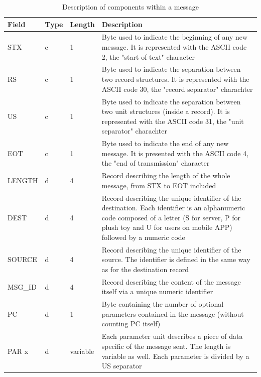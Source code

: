 \begin{table}[H]
\centering
\caption{Description of components within a message}
\label{my-label}
\begin{tabular}{|l|l|l|p{10cm}|}
\hline
\textbf{Field} & \textbf{Type} & \textbf{Length} & \textbf{Description}  \\ \hline
STX            & c             & 1               & Byte used to indicate the beginning of any new message. It is represented with the ASCII code 2, the "start of text" character \newline \\
RS             & c             & 1               & Byte used to indicate the separation between two record structures. It is represented with the ASCII code 30, the "record separator" charachter \newline \\
US             & c             & 1               & Byte used to indicate the separation between two unit structures (inside a record). It is represented with the ASCII code 31, the "unit separator" charachter \newline \\
EOT            & c             & 1               & Byte used to indicate the end of any new message. It is presented with the ASCII code 4, the "end of transmission" character \newline \\
LENGTH         & d             & 4               & Record describing the length of the whole message, from STX to EOT included \newline \\
DEST           & d             & 4               & Record describing the unique identifier of the destination. Each identifier is an alphanumeric code composed of a letter (S for server, P for plush toy and U for users on mobile APP) followed by a numeric code \newline \\
SOURCE         & d             & 4               & Record describing the unique identifier of the source. The identifier is defined in the same way as for the destination record \newline \\
MSG\_ID        & d             & 4               & Record describing the content of the message itself via a unique numeric identifier \newline \\ 
PC             & d             & 1               & Byte containing the number of optional parameters contained in the message (without counting PC itself) \newline \\
PAR x          & d             & variable        & Each parameter unit describes a piece of data specific of the message sent. The length is variable as well. Each parameter is divided by a US separator \\ \hline
\end{tabular}
\end{table}
\label{tab:comm_message}

